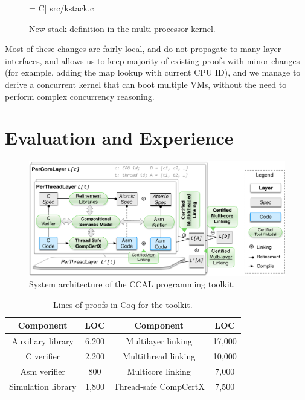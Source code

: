 \begin{figure}
 = C] {src/kstack.c}
\caption{New stack definition in the multi-processor kernel.}
\label{fig:kstack_c}
\end{figure}

Most of these changes are fairly local, and do not propagate to many layer interfaces, and
allows us to keep majority of existing proofs with minor changes (for example, adding the map lookup
with current CPU ID), and we manage to derive a concurrent kernel that can boot multiple VMs, without
the need to perform  complex concurrency reasoning.

\section{Evaluation and Experience}
\label{sec:kernel}

\begin{figure}[t]
\centering
\includegraphics[scale=.45]{figs/tool_chain}
\caption{System architecture of the CCAL programming toolkit.}
\label{fig:toolchain}
\end{figure}

\begin{table}
\begin{center}
\begin{footnotesize}
\renewcommand{\arraystretch}{1} 
\begin{tabular}{|c|c||c|c|}
\hline
Component & LOC & Component & LOC \\
\hline
\hline
Auxiliary library & 6,200 & Multilayer linking & 17,000 \\
\hline
C verifier & 2,200 & Multithread linking & 10,000 \\
\hline
Asm verifier & 800 & Multicore linking & 7,000 \\
\hline
Simulation library & 1,800 & Thread-safe CompCertX & 7,500\\
\hline
\end{tabular}
\end{footnotesize}
\end{center}
\caption{Lines of proofs in Coq for the toolkit.}
\label{table:toolkit}
\end{table}

